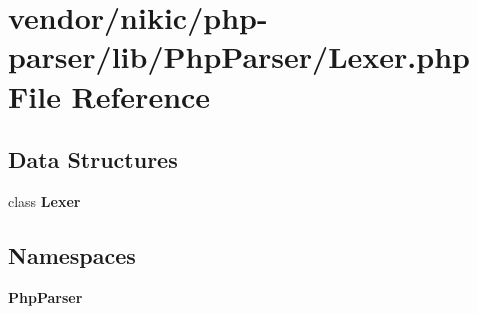 \section{vendor/nikic/php-\/parser/lib/\+Php\+Parser/\+Lexer.php File Reference}
\label{_lexer_8php}
\subsection*{Data Structures}
\begin{DoxyCompactItemize}
\item 
class {\bf Lexer}
\end{DoxyCompactItemize}
\subsection*{Namespaces}
\begin{DoxyCompactItemize}
\item 
 {\bf Php\+Parser}
\end{DoxyCompactItemize}
